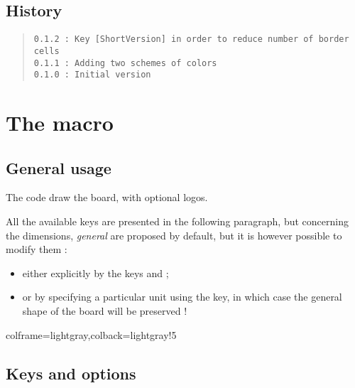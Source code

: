 \documentclass[11pt,a4paper]{ltxdoc}
\begin{document}
\vfill

\subsection{History}

\begin{quote}
\begin{verbatim}
0.1.2 : Key [ShortVersion] in order to reduce number of border cells
0.1.1 : Adding two schemes of colors
0.1.0 : Initial version
\end{verbatim}
\end{quote}

\pagebreak

\section{The macro}

\subsection{General usage}

The code draw the board, with optional logos.

All the available keys are presented in the following paragraph, but concerning the dimensions, \textit{general} are proposed by default, but it is however possible to modify them :

\begin{itemize}
	\item either explicitly by the keys \MontreCode{[Radius=]} and \MontreCode{[BorderHeight=]};
	\item or by specifying a particular unit using the \MontreCode{[Unit=]} key, in which case the general shape of the board will be preserved !
\end{itemize}

\begin{tcblisting}{colframe=lightgray,colback=lightgray!5}
\BoardTrivialPursuit[Unit=0.5]
%
\BoardTrivialPursuit[Radius=4,BorderHeight=1.25] %

\BoardTrivialPursuit[Unit=0.33]
%
\BoardTrivialPursuit[Unit=0.33,ShortVersion]
\end{tcblisting}

\pagebreak

\subsection{Keys and options}
\end{document}
